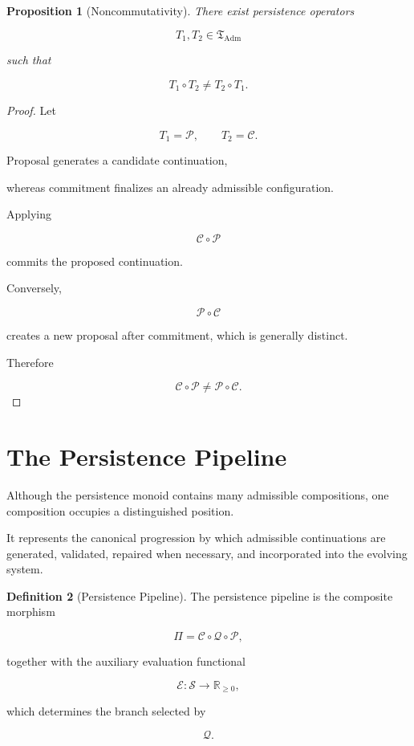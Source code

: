 \documentclass[11pt]{book}
\numberwithin{equation}{chapter}
\theoremstyle{definition}
\newtheorem{definition}{Definition}[chapter]
\theoremstyle{plain}
\newtheorem{proposition}[definition]{Proposition}
\begin{document}
\begin{proposition}[Noncommutativity]

There exist persistence operators

\[
T_1,T_2
\in
\mathfrak T_{\operatorname{Adm}}
\]

such that

\[
T_1\circ T_2
\neq
T_2\circ T_1.
\]

\end{proposition}

\begin{proof}

Let

\[
T_1=\mathcal P,
\qquad
T_2=\mathcal C.
\]

Proposal generates a candidate continuation,

whereas commitment finalizes an already admissible configuration.

Applying

\[
\mathcal C\circ\mathcal P
\]

commits the proposed continuation.

Conversely,

\[
\mathcal P\circ\mathcal C
\]

creates a new proposal after commitment,
which is generally distinct.

Therefore

\[
\mathcal C\circ\mathcal P
\neq
\mathcal P\circ\mathcal C.
\]

\end{proof}

\section{The Persistence Pipeline}

Although the persistence monoid contains many admissible compositions,
one composition occupies a distinguished position.

It represents the canonical progression by which admissible continuations
are generated, validated, repaired when necessary, and incorporated into
the evolving system.

\begin{definition}[Persistence Pipeline]

The persistence pipeline is the composite morphism

\[
\Pi
=
\mathcal C
\circ
\mathcal Q
\circ
\mathcal P,
\]

together with the auxiliary evaluation functional

\[
\mathcal E
:
\mathcal S
\rightarrow
\mathbb R_{\ge0},
\]

which determines the branch selected by

\[
\mathcal Q.
\]

\end{definition}
\end{document}
